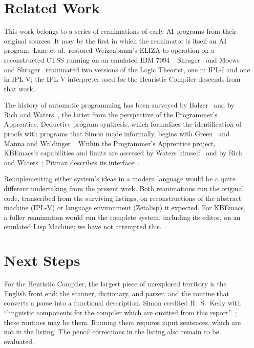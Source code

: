 \documentclass[11pt]{article}
\begin{document}
\section{Related Work}
\label{sec:related}

This work belongs to a series of reanimations of early AI programs from
their original sources. It may be the first in which the reanimator is
itself an AI program. Lane et al.\ restored Weizenbaum's ELIZA to
operation on a reconstructed CTSS running on an emulated IBM
7094~\cite{lane2025eliza}. Shrager~\cite{shrager2026} and Moews and
Shrager~\cite{moewsshrager2026} reanimated two versions of the Logic
Theorist, one in IPL-I and one in IPL-V; the IPL-V interpreter used for
the Heuristic Compiler descends from that work.

The history of automatic programming has been surveyed by
Balzer~\cite{balzer1985} and by Rich and
Waters~\cite{richwaters1988myths}, the latter from the perspective of
the Programmer's Apprentice. Deductive program synthesis, which
formalizes the identification of proofs with programs that Simon made
informally, begins with Green~\cite{green1969} and Manna and
Waldinger~\cite{mannawaldinger1971}. Within the Programmer's Apprentice
project, KBEmacs's capabilities and limits are assessed by Waters
himself~\cite{waters1986aimag} and by Rich and
Waters~\cite{richwaters1987overview,richwaters1990book}; Pitman
describes its interface~\cite{pitman1983}.

Reimplementing either system's ideas in a modern language would be a
quite different undertaking from the present work. Both reanimations
run the original code, transcribed from the surviving listings, on
reconstructions of the abstract machine (IPL-V) or language
environment (Zetalisp) it expected. For KBEmacs, a fuller reanimation
would run the complete system, including its editor, on an emulated
Lisp Machine; we have not attempted this.

\section{Next Steps}
\label{sec:next}

For the Heuristic Compiler, the largest piece of unexplored territory
is the English front end: the scanner, dictionary, and parser, and the
routine that converts a parse into a functional description. Simon credited H.~S.~Kelly with
``linguistic components for the compiler which are omitted from this
report''~\cite[p.~506]{simon1963jacm}; these routines may be them. Running
them requires input sentences, which are not in the listing. The pencil
corrections in the listing also remain to be evaluated.
\end{document}
